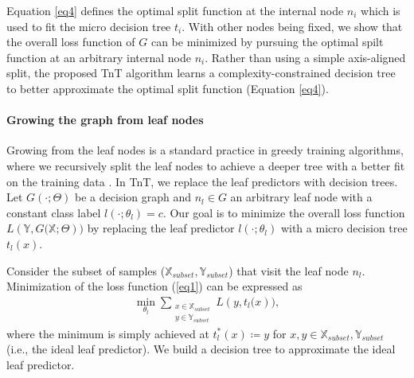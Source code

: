 \documentclass{article}
\begin{document}
Equation \eqref{eq4} defines the optimal split function at the internal node $n_i$ which is used to fit the micro decision tree $t_i$. With other nodes being fixed, we show that the overall loss function of $G$ can be minimized by pursuing the optimal spilt function at an arbitrary internal node $n_i$. Rather than using a simple axis-aligned split, the proposed TnT algorithm learns a complexity-constrained decision tree to better approximate the optimal split function (Equation \eqref{eq4}).



\vspace{-2mm}
\paragraph{Growing the graph from leaf nodes} Growing from the leaf nodes is a standard practice in greedy training algorithms, where we recursively split the leaf nodes to achieve a deeper tree with a better fit on the training data \cite{steinberg2009cart}. In TnT, we replace the leaf predictors with decision trees. Let $G(\cdot; \Theta)$ be a decision graph and $n_l \in G$ an arbitrary leaf node with a constant class label $l(\cdot;\theta_l)=c$. Our goal is to minimize the overall loss function $L\left(\mathbb{Y}, G(\mathbb{X}; \Theta\right))$ by replacing the leaf predictor $l(\cdot;\theta_l)$ with a micro decision tree $t_l(x)$.

Consider the subset of samples ($\mathbb{X}_{subset}, \mathbb{Y}_{subset}$) that visit the leaf node $n_l$. Minimization of the loss function (\ref{eq1}) can be expressed as 
\begin{gather}
\label{eq5}
    \min_{\theta_l} \sum_{\substack{x\in\mathbb{X}_{subset}\\
                  y\in\mathbb{Y}_{subset}}}
                  L\left(y, t_l(x \right)),
\end{gather}
where the minimum is simply achieved at $t_l^*(x)\coloneqq y$ for $x,y \in \mathbb{X}_{subset}, \mathbb{Y}_{subset}$ (i.e., the ideal leaf predictor). We build a decision tree to approximate the ideal leaf predictor.%

\end{document}
